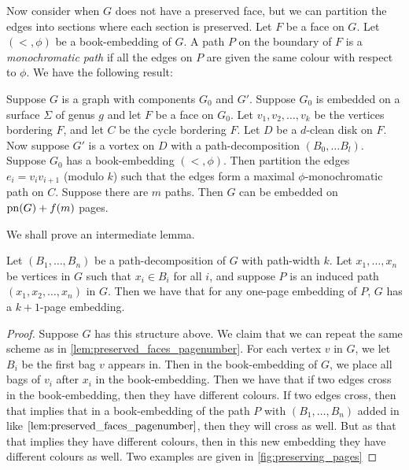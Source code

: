 Now consider when \(G\) does not have a preserved face, but we can partition the edges into sections where each section is preserved. Let \(F\) be a face on \(G\). Let \( (<, \phi) \) be a book-embedding of \(G\). A path \(P\) on the boundary of \(F\) is a \textit{monochromatic path} if all the edges on \(P\) are given the same colour with respect to \( \phi \). We have the following result:
\begin{lemma}\label{lem:vortices_mono_paths}
	Suppose \(G\) is a graph with components \(G_0\) and \(G'\). Suppose \(G_0\) is embedded on a surface \(\Sigma \) of genus \(g\) and let \(F\) be a face on \(G_0\). Let \(v_1, v_2, \ldots, v_k\) be the vertices bordering \(F\), and let \(C\) be the cycle bordering \(F\). Let \(D\) be a \(d\)-clean disk on \(F\). Now suppose \(G'\) is a vortex on \(D\) with a path-decomposition \((B_0, \ldots B_l)\). Suppose \(G_0\) has a book-embedding \((<, \phi)\). Then partition the edges \(e_i = v_i v_{i + 1}\) (modulo \(k\)) such that the edges form a maximal \(\phi \)-monochromatic path on \(C\). Suppose there are \(m\) paths. Then \(G\) can be embedded on \(\operatorname{pn}(G) + f(m)\) pages.
\end{lemma}
We shall prove an intermediate lemma.
\begin{lemma}\label{lem:one_page_decomposition}
	Let \((B_1, \ldots, B_n)\) be a path-decomposition of \(G\) with path-width \(k\). Let \(x_1, \ldots, x_n\) be vertices in \(G\) such that \(x_i \in B_i\) for all \(i\), and suppose \(P\) is an induced path \((x_1, x_2, \ldots, x_n)\) in \(G\). Then we have that for any one-page embedding of \(P\), \(G\) has a \(k + 1\)-page embedding.
\end{lemma}
\begin{proof}
	Suppose \(G\) has this structure above.
	We claim that we can repeat the same scheme as in \cref{lem:preserved_faces_pagenumber}. For each vertex \(v\) in \(G\), we let \(B_i\) be the first bag \(v\) appears in. Then in the book-embedding of \(G\), we place all bags of \(v_i\) after \(x_i\) in the book-embedding. Then we have that if two edges cross in the book-embedding, then they have different colours. If two edges cross, then that implies that in a book-embedding of the path \(P\) with \((B_1, \ldots, B_n)\) added in like \(\cref{lem:preserved_faces_pagenumber}\), then they will cross as well. But as that that implies they have different colours, then in this new embedding they have different colours as well. Two examples are given in \cref{fig:preserving_pages}
\end{proof}


